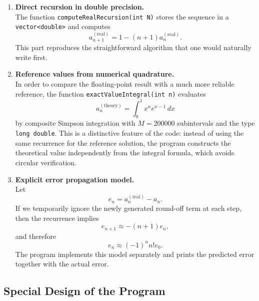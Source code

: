 \documentclass[12pt,a4paper]{article}
\begin{document}
\begin{enumerate}[label=\arabic*.]
    \item \textbf{Direct recursion in double precision.} \\
    The function \texttt{computeRealRecursion(int N)} stores the sequence in a \texttt{vector<double>} and computes
    \begin{equation}
        a_{n+1}^{(\mathrm{real})} = 1 - (n+1)a_n^{(\mathrm{real})}.
    \end{equation}
    This part reproduces the straightforward algorithm that one would naturally write first.

    \item \textbf{Reference values from numerical quadrature.} \\
    In order to compare the floating-point result with a much more reliable reference, the function \texttt{exactValueIntegral(int n)} evaluates
    \begin{equation}
        a_n^{(\mathrm{theory})} = \int_0^1 x^n e^{x-1} \, dx
    \end{equation}
    by composite Simpson integration with $M = 200000$ subintervals and the type \texttt{long double}. This is a distinctive feature of the code: instead of using the same recurrence for the reference solution, the program constructs the theoretical value independently from the integral formula, which avoids circular verification.

    \item \textbf{Explicit error propagation model.} \\
    Let
    \begin{equation}
        e_n = a_n^{(\mathrm{real})} - a_n.
    \end{equation}
    If we temporarily ignore the newly generated round-off term at each step, then the recurrence implies
    \begin{equation}
        e_{n+1} \approx -(n+1)e_n,
    \end{equation}
    and therefore
    \begin{equation}
        e_n \approx (-1)^n n! e_0.
    \end{equation}
    The program implements this model separately and prints the predicted error together with the actual error.
\end{enumerate}

\subsection*{Special Design of the Program}
\end{document}
